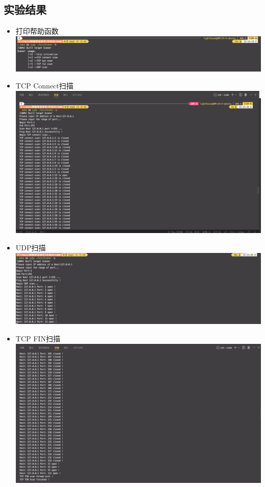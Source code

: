 \documentclass[UTF8,a4paper,10pt]{ctexart}
\begin{document}
\subsection{实验结果}
\begin{itemize}
    \item 打印帮助函数 \\
    \includegraphics[scale = 0.25]{img/13.png}
    \item TCP Connect扫描\\
    \includegraphics[scale = 0.45]{img/14.png}
    \item UDP扫描\\
    \includegraphics[scale = 0.25]{img/15.png}
    \item TCP FIN扫描\\ 
    \includegraphics[scale = 0.25]{img/12.png}

\end{itemize}
\end{document}
